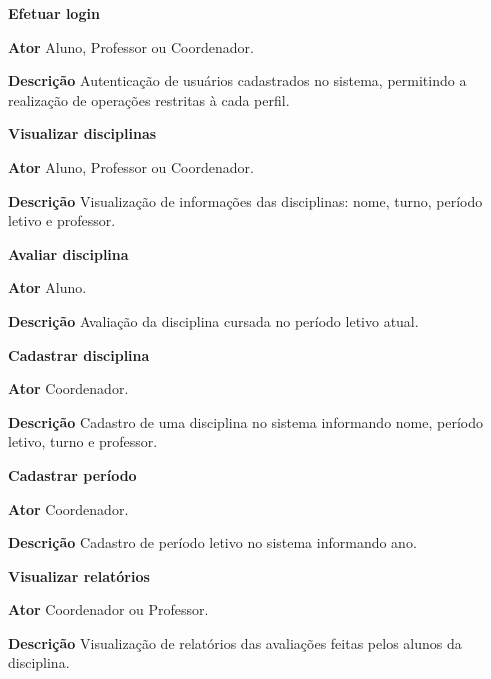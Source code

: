 \begin{alineas}
    \item \textbf{Efetuar login}
        \begin{alineas}
            \item \textbf{Ator} Aluno, Professor ou Coordenador.
            \item \textbf{Descrição} Autenticação de usuários cadastrados no sistema, permitindo a realização de operações restritas à cada perfil.
        \end{alineas}
    \item \textbf{Visualizar disciplinas}
        \begin{alineas}
            \item \textbf{Ator} Aluno, Professor ou Coordenador.
            \item \textbf{Descrição} Visualização de informações das disciplinas: nome, turno, período letivo e professor.
        \end{alineas}
    \item \textbf{Avaliar disciplina}
        \begin{alineas}
            \item \textbf{Ator} Aluno.
            \item \textbf{Descrição} Avaliação da disciplina cursada no período letivo atual.
        \end{alineas}
    \item \textbf{Cadastrar disciplina}
        \begin{alineas}
            \item \textbf{Ator} Coordenador.
            \item \textbf{Descrição} Cadastro de uma disciplina no sistema informando nome, período letivo, turno e professor.
        \end{alineas}
    \item \textbf{Cadastrar período}
        \begin{alineas}
            \item \textbf{Ator} Coordenador.
            \item \textbf{Descrição} Cadastro de período letivo no sistema informando ano.
        \end{alineas}
    \item \textbf{Visualizar relatórios}
        \begin{alineas}
            \item \textbf{Ator} Coordenador ou Professor.
            \item \textbf{Descrição} Visualização de relatórios das avaliações feitas pelos alunos da disciplina.
        \end{alineas}
\end{alineas}

